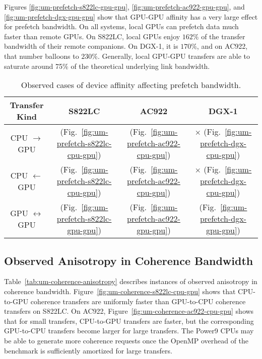 Figures \ref{fig:um-prefetch-s822lc-gpu-gpu}, \ref{fig:um-prefetch-ac922-gpu-gpu}, and \ref{fig:um-prefetch-dgx-gpu-gpu} show that GPU-GPU affinity has a very large effect for prefetch bandwidth.
On all systems, local GPUs can prefetch data much faster than remote GPUs.
On S822LC, local GPUs enjoy $162\%$ of the transfer bandwidth of their remote companions.
On DGX-1, it is $170\%$, and on AC922, that number balloons to $230\%$.
Generally, local GPU-GPU transfers are able to saturate around 75\% of the theoretical underlying link bandwidth.

\begin{table}[ht]
	\centering
	\caption[Device Affinity and prefetch Bandwidth]{
		Observed cases of device affinity affecting prefetch bandwidth.
	}
	\label{tab:um-prefetch-affinity}
	\begin{tabular}{cccc}
		\hline
		\textbf{Transfer Kind}    & \textbf{S822LC}                                        & \textbf{AC922}                                        & \textbf{DGX-1}                                      \\ \hline 
		CPU $\rightarrow$     GPU & \checkmark (Fig.~\ref{fig:um-prefetch-s822lc-cpu-gpu}) & \checkmark (Fig.~\ref{fig:um-prefetch-ac922-cpu-gpu}) & $\times$   (Fig.~\ref{fig:um-prefetch-dgx-cpu-gpu}) \\ \hline
		CPU $\leftarrow$      GPU & \checkmark (Fig.~\ref{fig:um-prefetch-s822lc-cpu-gpu}) & \checkmark (Fig.~\ref{fig:um-prefetch-ac922-cpu-gpu}) & $\times$   (Fig.~\ref{fig:um-prefetch-dgx-cpu-gpu}) \\ \hline
		GPU $\leftrightarrow$ GPU & \checkmark (Fig.~\ref{fig:um-prefetch-s822lc-gpu-gpu}) & \checkmark (Fig.~\ref{fig:um-prefetch-ac922-gpu-gpu}) & \checkmark (Fig.~\ref{fig:um-prefetch-dgx-gpu-gpu}) \\ \hline
	\end{tabular}
\end{table}

\subsection{Observed Anisotropy in Coherence Bandwidth}

Table~\ref{tab:um-coherence-anisotropy} describes instances of observed anisotropy in coherence bandwidth.
Figure~\ref{fig:um-coherence-s822lc-cpu-gpu} shows that CPU-to-GPU coherence transfers are uniformly faster than GPU-to-CPU coherence transfers on S822LC.
On AC922, Figure~\ref{fig:um-coherence-ac922-cpu-gpu} shows that for small transfers, CPU-to-GPU transfers are faster, but the corresponding GPU-to-CPU transfers become larger for large transfers.
The Power9 CPUs may be able to generate more coherence requests once the OpenMP overhead of the benchmark is sufficiently amortized for large transfers.

